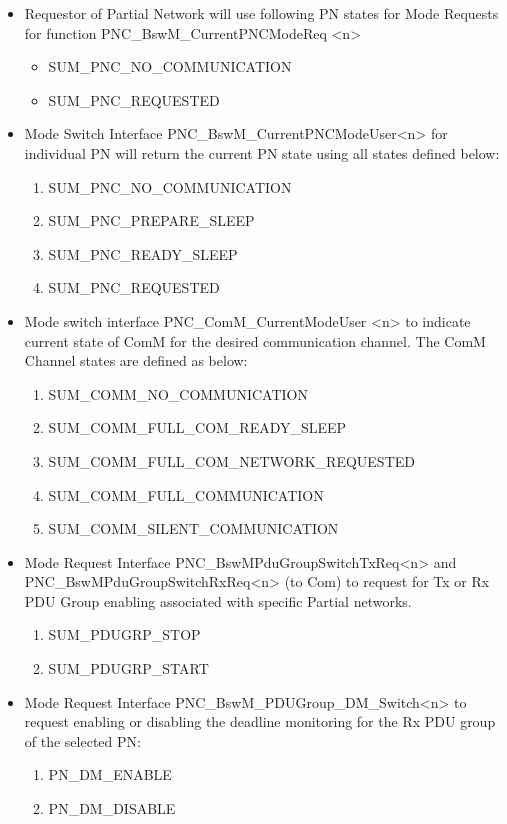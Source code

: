 \begin{itemize}
	\item Requestor of Partial Network will use following PN states for Mode Requests for function PNC\_BswM\_CurrentPNCModeReq <n>
	\begin{itemize}
		\item [a. ] SUM\_PNC\_NO\_COMMUNICATION
		\item [b. ] SUM\_PNC\_REQUESTED
	\end{itemize}
	\item Mode Switch Interface PNC\_BswM\_CurrentPNCModeUser<n> for individual PN will return the current PN state using all states defined below:
	\begin{enumerate}
		\item [a. ] SUM\_PNC\_NO\_COMMUNICATION
		\item [b. ] SUM\_PNC\_PREPARE\_SLEEP
		\item [c. ] SUM\_PNC\_READY\_SLEEP
		\item [d. ] SUM\_PNC\_REQUESTED
	\end{enumerate}
	\item Mode switch interface PNC\_ComM\_CurrentModeUser <n> to indicate current state of ComM for the desired communication channel. The ComM Channel states are defined as below:
	\begin{enumerate}
		\item [a. ] SUM\_COMM\_NO\_COMMUNICATION
		\item [b. ] SUM\_COMM\_FULL\_COM\_READY\_SLEEP
		\item [c. ] SUM\_COMM\_FULL\_COM\_NETWORK\_REQUESTED
		\item [d. ] SUM\_COMM\_FULL\_COMMUNICATION
		\item [e. ] SUM\_COMM\_SILENT\_COMMUNICATION
	\end{enumerate}
	\item Mode Request Interface PNC\_BswMPduGroupSwitchTxReq<n> and PNC\_BswMPduGroupSwitchRxReq<n> (to Com) to request for Tx or Rx PDU Group enabling associated with specific Partial networks.
	\begin{enumerate}
		\item [a. ] SUM\_PDUGRP\_STOP
		\item [b. ] SUM\_PDUGRP\_START
	\end{enumerate}	
	\item Mode Request Interface PNC\_BswM\_PDUGroup\_DM\_Switch<n> to request enabling or disabling the deadline monitoring for the Rx PDU group of the selected PN:
	\begin{enumerate}
		\item [a. ] PN\_DM\_ENABLE
		\item [b. ] PN\_DM\_DISABLE
	\end{enumerate}	
\end{itemize}

